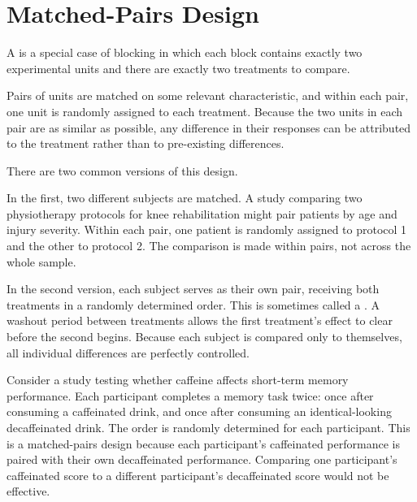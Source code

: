 \section{Matched-Pairs Design}

A  is a special case of blocking in which each block contains exactly two experimental units and there are exactly two treatments to compare. 

Pairs of units are matched on some relevant characteristic, and within each pair, one unit is randomly assigned to each treatment. Because the two units in each pair are as similar as possible, any difference in their responses can be attributed to the treatment rather than to pre-existing differences.

There are two common versions of this design.

In the first, two different subjects are matched. A study comparing two physiotherapy protocols for knee rehabilitation might pair patients by age and injury severity. Within each pair, one patient is randomly assigned to protocol 1 and the other to protocol 2. The comparison is made within pairs, not across the whole sample.

In the second version, each subject serves as their own pair, receiving both treatments in a randomly determined order. This is sometimes called a . A washout period between treatments allows the first treatment's effect to clear before the second begins. Because each subject is compared only to themselves, all individual differences are perfectly controlled.

Consider a study testing whether caffeine affects short-term memory performance. Each participant completes a memory task twice: once after consuming a caffeinated drink, and once after consuming an identical-looking decaffeinated drink. The order is randomly determined for each participant. This is a matched-pairs design because each participant's caffeinated performance is paired with their own decaffeinated performance. Comparing one participant's caffeinated score to a different participant's decaffeinated score would not be effective.

